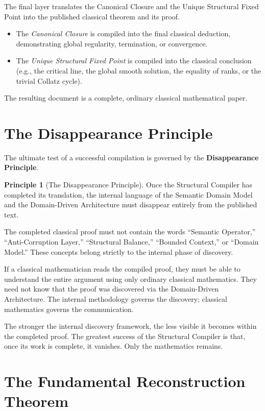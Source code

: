 \documentclass[12pt,openany]{extbook}
\theoremstyle{plain}
\theoremstyle{definition}
\newtheorem{principle}{Principle}[chapter]
\begin{document}
The final layer translates the Canonical Closure and the Unique Structural Fixed Point into the published classical theorem and its proof.
\begin{itemize}
    \item The \emph{Canonical Closure} is compiled into the final classical deduction, demonstrating global regularity, termination, or convergence.
    \item The \emph{Unique Structural Fixed Point} is compiled into the classical conclusion (e.g., the critical line, the global smooth solution, the equality of ranks, or the trivial Collatz cycle).
\end{itemize}
The resulting document is a complete, ordinary classical mathematical paper. 

\section{The Disappearance Principle}

The ultimate test of a successful compilation is governed by the \textbf{Disappearance Principle}.

\begin{principle}[The Disappearance Principle]
Once the Structural Compiler has completed its translation, the internal language of the Semantic Domain Model and the Domain-Driven Architecture must disappear entirely from the published text.
\end{principle}

The completed classical proof must not contain the words ``Semantic Operator,'' ``Anti-Corruption Layer,'' ``Structural Balance,'' ``Bounded Context,'' or ``Domain Model.'' These concepts belong strictly to the internal phase of discovery. 

If a classical mathematician reads the compiled proof, they must be able to understand the entire argument using only ordinary classical mathematics. They need not know that the proof was discovered via the Domain-Driven Architecture. The internal methodology governs the discovery; classical mathematics governs the communication.

The stronger the internal discovery framework, the less visible it becomes within the completed proof. The greatest success of the Structural Compiler is that, once its work is complete, it vanishes. Only the mathematics remains.

\section{The Fundamental Reconstruction Theorem}
\end{document}
